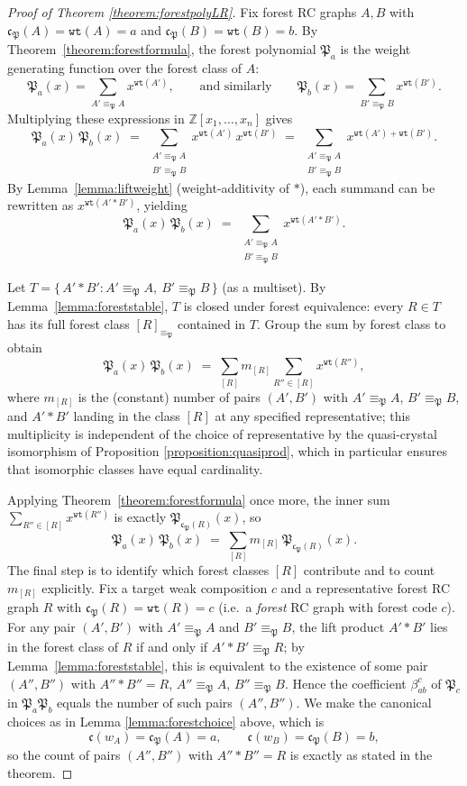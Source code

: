 \documentclass[pdflatex,sn-mathphys-num]{sn-jnl}
\numberwithin{equation}{subsection}
\newcommand{\wof}[1]{w_{#1}}
\newcommand{\wtt}{\mathtt{wt}}
\newcommand{\code}{\mathfrak{c}}
\newcommand{\forest}{\mathfrak{P}}
\newcommand{\fcode}{\mathfrak{c}_\forest}
\theoremstyle{thmstyleone}
\theoremstyle{thmstylethree}
\theoremstyle{thmstyletwo}
\begin{document}
\begin{proof}[Proof of Theorem \ref{theorem:forestpolyLR}]
Fix forest RC graphs $A, B$ with $\code_\forest(A)=\wtt(A)=a$ and $\code_\forest(B)=\wtt(B)=b$. By Theorem~\ref{theorem:forestformula}, the forest polynomial $\forest_a$ is the weight generating function over the forest class of $A$:
$$\forest_a(x) = \sum_{A'\equiv_\forest A} x^{\wtt(A')},\qquad\text{and similarly}\qquad \forest_b(x) = \sum_{B'\equiv_\forest B} x^{\wtt(B')}.$$
Multiplying these expressions in $\mathbb{Z}[x_1,\ldots,x_n]$ gives
$$\forest_a(x)\,\forest_b(x) \;=\; \sum_{\substack{A'\equiv_\forest A\\ B'\equiv_\forest B}} x^{\wtt(A')}\,x^{\wtt(B')}\;=\;\sum_{\substack{A'\equiv_\forest A\\ B'\equiv_\forest B}} x^{\wtt(A')+\wtt(B')}.$$
By Lemma~\ref{lemma:liftweight} (weight-additivity of $*$), each summand can be rewritten as $x^{\wtt(A'*B')}$, yielding
$$\forest_a(x)\,\forest_b(x) \;=\; \sum_{\substack{A'\equiv_\forest A\\ B'\equiv_\forest B}} x^{\wtt(A'*B')}.$$

Let $T = \{\,A'*B' : A'\equiv_\forest A,\ B'\equiv_\forest B\,\}$ (as a multiset). By Lemma~\ref{lemma:foreststable}, $T$ is closed under forest equivalence: every $R\in T$ has its full forest class $[R]_{\equiv_\forest}$ contained in $T$. Group the sum by forest class to obtain
$$\forest_a(x)\,\forest_b(x) \;=\; \sum_{[R]} m_{[R]}\sum_{R''\in[R]} x^{\wtt(R'')},$$
where $m_{[R]}$ is the (constant) number of pairs $(A',B')$ with $A'\equiv_\forest A$, $B'\equiv_\forest B$, and $A'*B'$ landing in the class $[R]$ at any specified representative; this multiplicity is independent of the choice of representative by the quasi-crystal isomorphism of Proposition \ref{proposition:quasiprod}, which in particular ensures that isomorphic classes have equal cardinality.

Applying Theorem~\ref{theorem:forestformula} once more, the inner sum $\sum_{R''\in[R]}x^{\wtt(R'')}$ is exactly $\forest_{\fcode(R)}(x)$, so
$$\forest_a(x)\,\forest_b(x) \;=\; \sum_{[R]} m_{[R]}\,\forest_{\fcode(R)}(x).$$
The final step is to identify which forest classes $[R]$ contribute and to count $m_{[R]}$ explicitly. Fix a target weak composition $c$ and a representative forest RC graph $R$ with $\code_\forest(R)=\wtt(R)=c$ (i.e.\ a \emph{forest} RC graph with forest code $c$). For any pair $(A',B')$ with $A'\equiv_\forest A$ and $B'\equiv_\forest B$, the lift product $A'*B'$ lies in the forest class of $R$ if and only if $A'*B'\equiv_\forest R$; by Lemma~\ref{lemma:foreststable}, this is equivalent to the existence of some pair $(A'',B'')$ with $A''*B''=R$, $A''\equiv_\forest A$, $B''\equiv_\forest B$. Hence the coefficient $\beta_{ab}^c$ of $\forest_c$ in $\forest_a\forest_b$ equals the number of such pairs $(A'',B'')$. We make the canonical choices as in Lemma \ref{lemma:forestchoice} above, which is 
$$\code(\wof{A})=\code_\forest(A)=a,\qquad \code(\wof{B})=\code_\forest(B)=b,$$
so the count of pairs $(A'',B'')$ with $A''*B''=R$ is exactly as stated in the theorem.
\end{proof}
\end{document}
